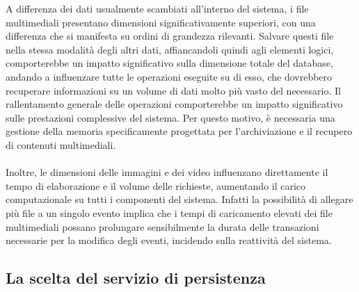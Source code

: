A differenza dei dati usualmente scambiati all'interno del sistema, 
i file multimediali presentano dimensioni significativamente superiori, 
con una differenza che si manifesta su ordini di grandezza rilevanti. 
Salvare questi file nella stessa modalità degli altri dati, 
affiancandoli quindi agli elementi logici, 
comporterebbe un impatto significativo sulla dimensione totale del database,
andando a influenzare tutte le operazioni eseguite su di esso,
che dovrebbero recuperare informazioni su un volume di dati molto più vasto del necessario.
Il rallentamento generale delle operazioni comporterebbe
un impatto significativo sulle prestazioni complessive del sistema.
Per questo motivo, è necessaria una gestione della memoria 
specificamente progettata per l'archiviazione e il recupero di contenuti multimediali.\\
\\
Inoltre, le dimensioni delle immagini e dei video influenzano direttamente 
il tempo di elaborazione e il volume delle richieste, 
aumentando il carico computazionale su tutti i componenti del sistema. 
Infatti la possibilità di allegare più file a un singolo evento implica 
che i tempi di caricamento elevati dei file multimediali 
possano prolungare sensibilmente la durata delle transazioni necessarie per la modifica degli eventi, 
incidendo sulla reattività del sistema.\\
\subsection{La scelta del servizio di persistenza}

